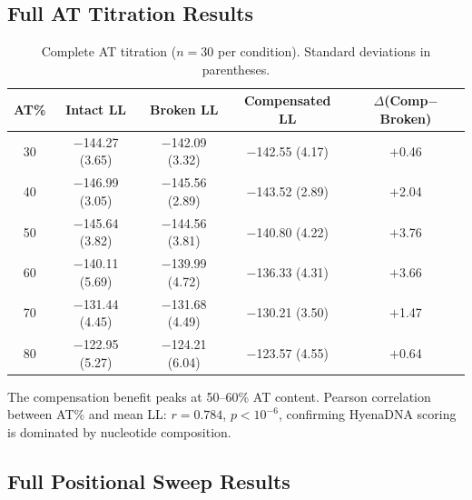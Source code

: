 \documentclass{article}
\begin{document}
\subsection{Full AT Titration Results}

\begin{table}[ht]
\caption{Complete AT titration ($n=30$ per condition). Standard deviations in parentheses.}
\label{tab:full_at}
\centering\small
\begin{tabular}{ccccc}
\toprule
AT\% & Intact LL & Broken LL & Compensated LL & $\Delta$(Comp$-$Broken) \\
\midrule
30 & $-$144.27 (3.65) & $-$142.09 (3.32) & $-$142.55 (4.17) & $+$0.46 \\
40 & $-$146.99 (3.05) & $-$145.56 (2.89) & $-$143.52 (2.89) & $+$2.04 \\
50 & $-$145.64 (3.82) & $-$144.56 (3.81) & $-$140.80 (4.22) & $+$3.76 \\
60 & $-$140.11 (5.69) & $-$139.99 (4.72) & $-$136.33 (4.31) & $+$3.66 \\
70 & $-$131.44 (4.45) & $-$131.68 (4.49) & $-$130.21 (3.50) & $+$1.47 \\
80 & $-$122.95 (5.27) & $-$124.21 (6.04) & $-$123.57 (4.55) & $+$0.64 \\
\bottomrule
\end{tabular}
\end{table}

The compensation benefit peaks at 50--60\% AT content.
Pearson correlation between AT\% and mean LL: $r = 0.784$, $p < 10^{-6}$, confirming
HyenaDNA scoring is dominated by nucleotide composition.

\subsection{Full Positional Sweep Results}
\end{document}
